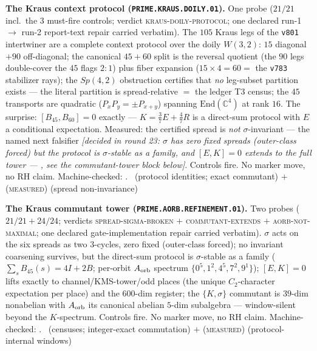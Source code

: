 \par\smallskip\noindent\textbf{The Kraus context protocol
(\texttt{PRIME.KRAUS.DOILY.01}).}
One probe ($21/21$ incl.\ the $3$ must-fire controls; verdict
\textsc{kraus-doily-protocol}; one declared run-1 $\to$ run-2
report-text repair carried verbatim).  The $105$ Kraus legs of the
\texttt{v801} intertwiner are a complete context protocol over the
doily $W(3,2)$: $15$ diagonal $+90$ off-diagonal; the canonical
$45+60$ split is the reversal quotient (the $90$ legs double-cover
the $45$ flags $2{:}1$) plus fiber expansion
($15\times4=60=$ the \texttt{v783} stabilizer rays); the
$Sp(4,2)$ obstruction certifies that \emph{no} leg-subset
partition exists --- the literal partition is spread-relative $=$
the ledger T3 census; the $45$ transports are quadratic
($P_xP_y=\pm P_{x+y}$) spanning $\mathrm{End}(\mathbb C^4)$ at rank
$16$.  The surprise: $[B_{45},B_{60}]=0$ exactly ---
$K=\tfrac37E+\tfrac47R$ is a direct-sum protocol with $E$ a
conditional expectation.  Measured: the certified spread is
\emph{not} $\sigma$-invariant --- the named next falsifier
\emph{[decided in round 23: $\sigma$ has zero fixed spreads
(outer-class forced) but the protocol is $\sigma$-stable as a
family, and $[E,K]=0$ extends to the full tower ---
, see the commutant-tower
block below]}.
Controls fire.  No marker move, no RH claim.
Machine-checked: .
\mE\ (protocol identities; exact commutant) $+$ (\textsc{measured})
(spread non-invariance)
\par\smallskip


\par\smallskip\noindent\textbf{The Kraus commutant tower
(\texttt{PRIME.AORB.REFINEMENT.01}).}
Two probes ($21/21+24/24$; verdicts \textsc{spread-sigma-broken}
$+$ \textsc{commutant-extends} $+$ \textsc{aorb-not-maximal}; one
declared gate-implementation repair carried verbatim).  $\sigma$
acts on the six spreads as two 3-cycles, zero fixed (outer-class
forced); no invariant coarsening survives, but the direct-sum
protocol is $\sigma$-stable as a family ($\sum_s B_{45}(s)=4I+2B$;
per-orbit $A_{\rm orb}$ spectrum $\{0^5,1^2,4^5,7^2,9^1\}$);
$[E,K]=0$ lifts exactly to channel/KMS-tower/odd places (the
unique $C_2$-character expectation per place) and the $600$-dim
register; the $\{K,\sigma\}$ commutant is $39$-dim nonabelian with
$A_{\rm orb}$ its canonical abelian $5$-dim subalgebra ---
window-silent beyond the $K$-spectrum.  Controls fire.  No marker
move, no RH claim.
Machine-checked: .
\mE\ (censuses; integer-exact commutation) $+$ (\textsc{measured})
(protocol-internal windows)
\par\smallskip


